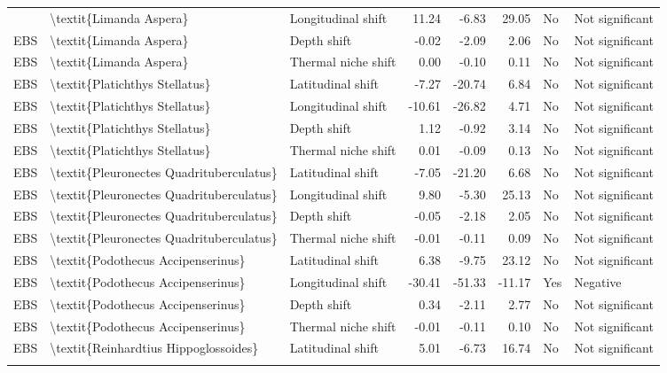 \begin{longtable}[t]{lllrrrll}
{{EBS & \textbackslash{}textit\{Limanda Aspera\} & Longitudinal shift & 11.24 & -6.83 & 29.05 & No & Not significant\\
\addlinespace
EBS & \textbackslash{}textit\{Limanda Aspera\} & Depth shift & -0.02 & -2.09 & 2.06 & No & Not significant\\
EBS & \textbackslash{}textit\{Limanda Aspera\} & Thermal niche shift & 0.00 & -0.10 & 0.11 & No & Not significant\\
EBS & \textbackslash{}textit\{Platichthys Stellatus\} & Latitudinal shift & -7.27 & -20.74 & 6.84 & No & Not significant\\
EBS & \textbackslash{}textit\{Platichthys Stellatus\} & Longitudinal shift & -10.61 & -26.82 & 4.71 & No & Not significant\\
EBS & \textbackslash{}textit\{Platichthys Stellatus\} & Depth shift & 1.12 & -0.92 & 3.14 & No & Not significant\\
\addlinespace
EBS & \textbackslash{}textit\{Platichthys Stellatus\} & Thermal niche shift & 0.01 & -0.09 & 0.13 & No & Not significant\\
EBS & \textbackslash{}textit\{Pleuronectes Quadrituberculatus\} & Latitudinal shift & -7.05 & -21.20 & 6.68 & No & Not significant\\
EBS & \textbackslash{}textit\{Pleuronectes Quadrituberculatus\} & Longitudinal shift & 9.80 & -5.30 & 25.13 & No & Not significant\\
EBS & \textbackslash{}textit\{Pleuronectes Quadrituberculatus\} & Depth shift & -0.05 & -2.18 & 2.05 & No & Not significant\\
EBS & \textbackslash{}textit\{Pleuronectes Quadrituberculatus\} & Thermal niche shift & -0.01 & -0.11 & 0.09 & No & Not significant\\
\addlinespace
EBS & \textbackslash{}textit\{Podothecus Accipenserinus\} & Latitudinal shift & 6.38 & -9.75 & 23.12 & No & Not significant\\
EBS & \textbackslash{}textit\{Podothecus Accipenserinus\} & Longitudinal shift & -30.41 & -51.33 & -11.17 & Yes & Negative\\
EBS & \textbackslash{}textit\{Podothecus Accipenserinus\} & Depth shift & 0.34 & -2.11 & 2.77 & No & Not significant\\
EBS & \textbackslash{}textit\{Podothecus Accipenserinus\} & Thermal niche shift & -0.01 & -0.11 & 0.10 & No & Not significant\\
EBS & \textbackslash{}textit\{Reinhardtius Hippoglossoides\} & Latitudinal shift & 5.01 & -6.73 & 16.74 & No & Not significant\\
}}
\end{longtable}
